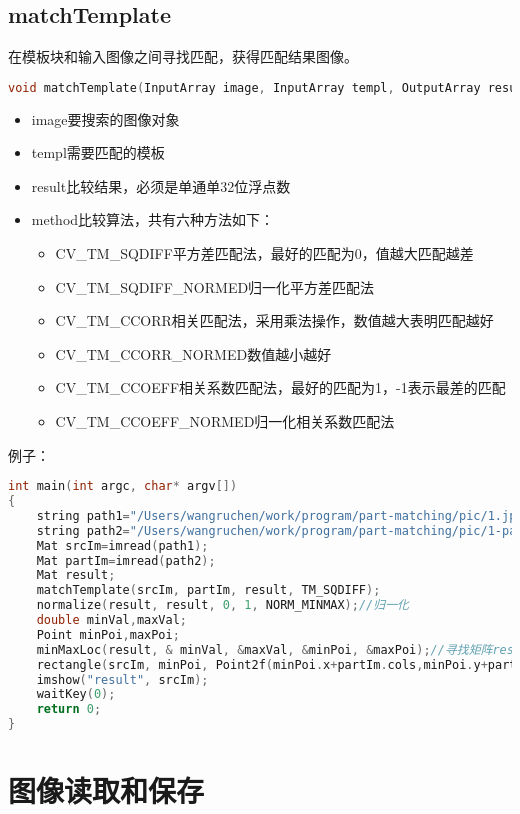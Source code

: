 \documentclass[12pt]{article}
\begin{document}
\subsection{matchTemplate}
在模板块和输入图像之间寻找匹配，获得匹配结果图像。
\begin{lstlisting}[language=c++]
void matchTemplate(InputArray image, InputArray templ, OutputArray result, int method)
\end{lstlisting}
\begin{itemize}
\item image要搜索的图像对象
\item templ需要匹配的模板
\item result比较结果，必须是单通单32位浮点数
\item method比较算法，共有六种方法如下：
	\begin{itemize}
	\item CV\_TM\_SQDIFF平方差匹配法，最好的匹配为0，值越大匹配越差
	\item CV\_TM\_SQDIFF\_NORMED归一化平方差匹配法
	\item CV\_TM\_CCORR相关匹配法，采用乘法操作，数值越大表明匹配越好
	\item CV\_TM\_CCORR\_NORMED数值越小越好
	\item CV\_TM\_CCOEFF相关系数匹配法，最好的匹配为1，-1表示最差的匹配
	\item CV\_TM\_CCOEFF\_NORMED归一化相关系数匹配法
	\end{itemize}
\end{itemize}
例子：
\begin{lstlisting}[language=c++]
int main(int argc, char* argv[])
{
    string path1="/Users/wangruchen/work/program/part-matching/pic/1.jpg";
    string path2="/Users/wangruchen/work/program/part-matching/pic/1-part.png";
    Mat srcIm=imread(path1);
    Mat partIm=imread(path2);
    Mat result;
    matchTemplate(srcIm, partIm, result, TM_SQDIFF);
    normalize(result, result, 0, 1, NORM_MINMAX);//归一化
    double minVal,maxVal;
    Point minPoi,maxPoi;
    minMaxLoc(result, & minVal, &maxVal, &minPoi, &maxPoi);//寻找矩阵result中最大值和最小值的位置
    rectangle(srcIm, minPoi, Point2f(minPoi.x+partIm.cols,minPoi.y+partIm.rows), Scalar(255,0,0));//在匹配位置画出矩形
    imshow("result", srcIm);
    waitKey(0);
    return 0;
}
\end{lstlisting}



\section{图像读取和保存}
\end{document}
